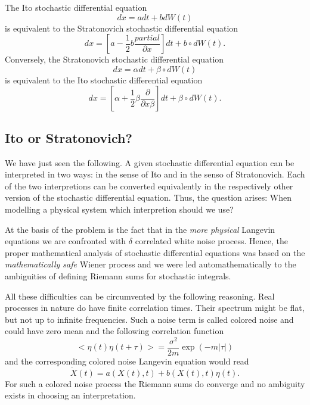 The Ito stochastic differential equation
\begin{equation}
dx = a dt + b dW(t)
\end{equation}
is equivalent to the Stratonovich stochastic differential equation
\begin{equation}
dx = [a- \frac{1}{2} b \frac{partial}{\partial x}] dt + b \circ 
dW(t).
\end{equation}
Conversely, the Stratonovich stochastic differential equation
\begin{equation*}
dx = \alpha dt + \beta \circ dW(t)
\end{equation*}
is equivalent to the Ito stochastic differential equation
\begin{equation*}
dx = [\alpha + \frac{1}{2} \beta \frac{\partial}{\partial x 
\beta}]dt + \beta \circ dW(t).
\end{equation*}

\subsection{Ito or Stratonovich?}
We have just seen the following. A given stochastic differential 
equation can be interpreted in two ways: in the sense of Ito and 
in the senso of Stratonovich. Each of the two interpretions can be converted
equivalently in the respectively other version of the stochastic differential 
equation. Thus, the question arises: When modelling a physical 
system which interpretion should we use? 

At the basis of the problem is the fact that 
in the {\em more physical} Langevin equations we are confronted
with $\delta$ correlated white noise process.
Hence, the proper 
mathematical analysis of stochastic differential equations was based 
on the {\em mathematically safe} Wiener process and we were led
automathematically to the ambiguities of defining Riemann sums for 
stochastic integrals.

All these difficulties can be circumvented by the following 
reasoning. Real processes in nature do have finite correlation 
times. Their spectrum might be flat, but not up to infinite 
frequencies. Such a noise term is called colored  noise and could 
have zero mean and the following correlation function
\begin{equation*}
< \eta(t) \eta(t+\tau) > = \frac{\sigma^2}{2m} \exp(- m |\tau|)
\end{equation*}
and the corresponding colored noise Langevin equation would read
\begin{equation}
\dot{X}(t) = a(X(t),t) + b(X(t),t) \eta(t).
\end{equation}
For such a colored noise process the Riemann sums do converge and 
no ambiguity exists in choosing an interpretation.

